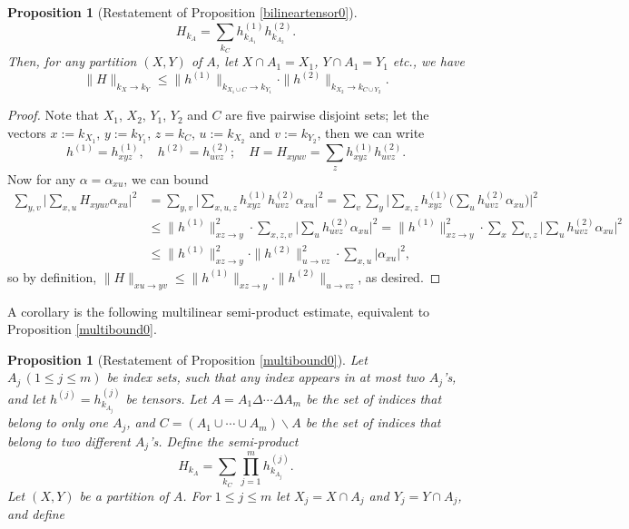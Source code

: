 \documentclass[11 pt,reqno]{amsart}
\newtheorem{prop}[thm]{Proposition}
\theoremstyle{definition}
\theoremstyle{remark}
\numberwithin{equation}{section}
\begin{document}
{\begin{prop}[Restatement of Proposition \ref{bilineartensor0}]
 \begin{equation}\label{combination}H_{k_A}=\sum_{k_C}h_{k_{A_1}}^{(1)}h_{k_{A_2}}^{(2)}.
 \end{equation} Then, for any partition $(X,Y)$ of $A$, let $X\cap A_1=X_1$, $Y\cap A_1 =Y_1$ etc., we have
 \begin{equation}\label{combinationbd}\|H\|_{k_X\to k_Y}\leq \|h^{(1)}\|_{k_{X_1\cup C}\to k_{Y_1}}\cdot\|h^{(2)}\|_{k_{X_2}\to k_{C\cup Y_2}}.
 \end{equation}
 \end{prop}
 \begin{proof} Note that $X_1$, $X_2$, $Y_1$, $Y_2$ and $C$ are five pairwise disjoint sets; let the vectors $x:=k_{X_1}$, $y:=k_{Y_1}$, $z=k_C$, $u:=k_{X_2}$ and $v:=k_{Y_2}$, then we can write
 \[h^{(1)}=h_{xyz}^{(1)},\quad h^{(2)}=h_{uvz}^{(2)};\quad H=H_{xyuv}=\sum_z h_{xyz}^{(1)}h_{uvz}^{(2)}.\] Now for any $\alpha=\alpha_{xu}$, we can bound
 \[
 \begin{aligned}\sum_{y,v}\bigg|\sum_{x,u}H_{xyuv}\alpha_{xu}\bigg|^2&=\sum_{y,v}\bigg|\sum_{x,u,z}h_{xyz}^{(1)}h_{uvz}^{(2)}\alpha_{xu}\bigg|^2=\sum_{v}\sum_y\bigg|\sum_{x,z}h_{xyz}^{(1)}\bigg(\sum_u h_{uvz}^{(2)}\alpha_{xu}\bigg)\bigg|^2\\
 &\leq \|h^{(1)}\|_{xz\to y}^2\cdot\sum_{x,z,v}\bigg|\sum_u h_{uvz}^{(2)}\alpha_{xu}\bigg|^2= \|h^{(1)}\|_{xz\to y}^2\cdot\sum_{x}\sum_{v,z}\bigg|\sum_u h_{uvz}^{(2)}\alpha_{xu}\bigg|^2\\
 &\leq   \|h^{(1)}\|_{xz\to y}^2\cdot \|h^{(2)}\|_{u\to vz}^2\cdot\sum_{x,u}|\alpha_{xu}|^2,
 \end{aligned}
 \] so by definition, $\|H\|_{xu\to yv}\leq \|h^{(1)}\|_{xz\to y}\cdot \|h^{(2)}\|_{u\to vz}$, as desired.
 \end{proof} A corollary is the following multilinear semi-product estimate, equivalent to Proposition \ref{multibound0}.
 \begin{prop}[Restatement of Proposition \ref{multibound0}]\label{multibound} Let $A_j\,(1\leq j\leq m)$ be index sets, such that any index appears in at most two $A_j$'s, and let $h^{(j)}=h_{k_{A_j}}^{(j)}$ be tensors. Let $A=A_1\Delta\cdots\Delta A_m$ be the set of indices that belong to only one $A_j$, and $C=(A_1\cup\cdots \cup A_m)\backslash A$ be the set of indices that belong to two different $A_j$'s. Define the semi-product
 \begin{equation}\label{combination2}H_{k_A}=\sum_{k_C}\prod_{j=1}^mh_{k_{A_j}}^{(j)}.
 \end{equation} Let $(X,Y)$ be a partition of $A$. For $1\leq j\leq m$ let $X_j=X\cap A_j$ and $Y_j=Y\cap A_j$, and define

\end{prop}}
\end{document}
